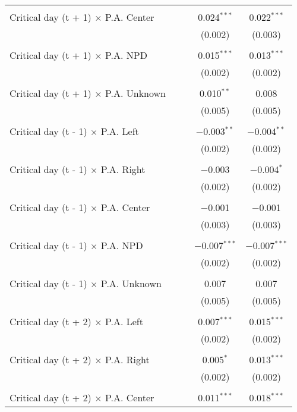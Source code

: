 \documentclass[
]{article}
\begin{document}
\begin{table}[!htbp]
{\begin{tabular}{@{\extracolsep{5pt}}lcccc}
  & & & & \\ 
 Critical day (t + 1) $\times$ P.A. Center &  &  & 0.024$^{***}$ & 0.022$^{***}$ \\ 
  &  &  & (0.002) & (0.003) \\ 
  & & & & \\ 
 Critical day (t + 1) $\times$ P.A. NPD &  &  & 0.015$^{***}$ & 0.013$^{***}$ \\ 
  &  &  & (0.002) & (0.002) \\ 
  & & & & \\ 
 Critical day (t + 1) $\times$ P.A. Unknown &  &  & 0.010$^{**}$ & 0.008 \\ 
  &  &  & (0.005) & (0.005) \\ 
  & & & & \\ 
 Critical day (t - 1) $\times$ P.A. Left &  &  & $-$0.003$^{**}$ & $-$0.004$^{**}$ \\ 
  &  &  & (0.002) & (0.002) \\ 
  & & & & \\ 
 Critical day (t - 1) $\times$ P.A. Right &  &  & $-$0.003 & $-$0.004$^{*}$ \\ 
  &  &  & (0.002) & (0.002) \\ 
  & & & & \\ 
 Critical day (t - 1) $\times$ P.A. Center &  &  & $-$0.001 & $-$0.001 \\ 
  &  &  & (0.003) & (0.003) \\ 
  & & & & \\ 
 Critical day (t - 1) $\times$ P.A. NPD &  &  & $-$0.007$^{***}$ & $-$0.007$^{***}$ \\ 
  &  &  & (0.002) & (0.002) \\ 
  & & & & \\ 
 Critical day (t - 1) $\times$ P.A. Unknown &  &  & 0.007 & 0.007 \\ 
  &  &  & (0.005) & (0.005) \\ 
  & & & & \\ 
 Critical day (t + 2) $\times$ P.A. Left &  &  & 0.007$^{***}$ & 0.015$^{***}$ \\ 
  &  &  & (0.002) & (0.002) \\ 
  & & & & \\ 
 Critical day (t + 2) $\times$ P.A. Right &  &  & 0.005$^{*}$ & 0.013$^{***}$ \\ 
  &  &  & (0.002) & (0.002) \\ 
  & & & & \\ 
 Critical day (t + 2) $\times$ P.A. Center &  &  & 0.011$^{***}$ & 0.018$^{***}$ \\ 

\end{tabular}}
\end{table}
\end{document}
